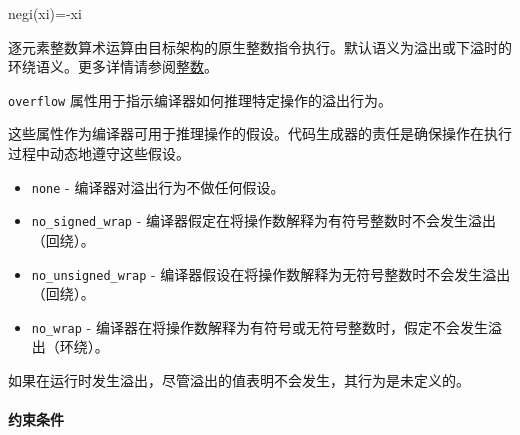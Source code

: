 \documentclass{article}
\begin{document}
negi(xi)=-xi


逐元素整数算术运算由目标架构的原生整数指令执行。默认语义为溢出或下溢时的环绕语义。更多详情请参阅\href{https://docs.nvidia.com/cuda/tile-ir/latest/sections/operations.html#op-group-integer}{整数}。



\texttt{overflow} 属性用于指示编译器如何推理特定操作的溢出行为。



这些属性作为编译器可用于推理操作的假设。代码生成器的责任是确保操作在执行过程中动态地遵守这些假设。



\begin{itemize}
\item \texttt{none} - 编译器对溢出行为不做任何假设。
\item \texttt{no\_signed\_wrap} - 编译器假定在将操作数解释为有符号整数时不会发生溢出（回绕）。
\item \texttt{no\_unsigned\_wrap} - 编译器假设在将操作数解释为无符号整数时不会发生溢出（回绕）。
\item \texttt{no\_wrap} - 编译器在将操作数解释为有符号或无符号整数时，假定不会发生溢出（环绕）。


\end{itemize}
如果在运行时发生溢出，尽管溢出的值表明不会发生，其行为是未定义的。





\paragraph{约束条件}
\end{document}
